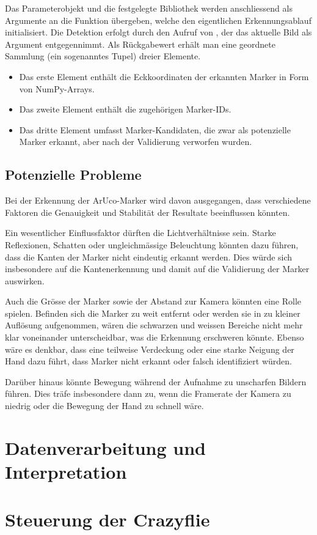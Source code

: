 Das Parameterobjekt und die festgelegte Bibliothek werden anschliessend als Argumente an die Funktion  übergeben, welche den eigentlichen Erkennungsablauf initialisiert.
Die Detektion erfolgt durch den Aufruf von , der das aktuelle Bild als Argument entgegennimmt.
Als Rückgabewert erhält man eine geordnete Sammlung (ein sogenanntes Tupel) dreier Elemente.

\begin{itemize}
    \item Das erste Element enthält die Eckkoordinaten der erkannten Marker in Form von NumPy-Arrays.
    \item Das zweite Element enthält die zugehörigen Marker-IDs.
    \item Das dritte Element umfasst Marker-Kandidaten\footnotemark{}, die zwar als potenzielle Marker erkannt, aber nach der Validierung verworfen wurden.
\end{itemize}


\subsection{Potenzielle Probleme}
Bei der Erkennung der ArUco-Marker wird davon ausgegangen, dass verschiedene Faktoren die Genauigkeit und Stabilität der Resultate beeinflussen könnten.

Ein wesentlicher Einflussfaktor dürften die Lichtverhältnisse sein.
Starke Reflexionen, Schatten oder ungleichmässige Beleuchtung könnten dazu führen, dass die Kanten der Marker nicht eindeutig erkannt werden.
Dies würde sich insbesondere auf die Kantenerkennung und damit auf die Validierung der Marker auswirken.

Auch die Grösse der Marker sowie der Abstand zur Kamera könnten eine Rolle spielen.
Befinden sich die Marker zu weit entfernt oder werden sie in zu kleiner Auflösung aufgenommen, wären die schwarzen und weissen Bereiche nicht mehr klar voneinander unterscheidbar, was die Erkennung erschweren könnte.
Ebenso wäre es denkbar, dass eine teilweise Verdeckung oder eine starke Neigung der Hand dazu führt, dass Marker nicht erkannt oder falsch identifiziert würden.

Darüber hinaus könnte Bewegung während der Aufnahme zu unscharfen Bildern führen.
Dies träfe insbesondere dann zu, wenn die Framerate der Kamera zu niedrig oder die Bewegung der Hand zu schnell wäre.

\section{Datenverarbeitung und Interpretation}

\section{Steuerung der Crazyflie}
\label{sec:cf_co}

\endgroup